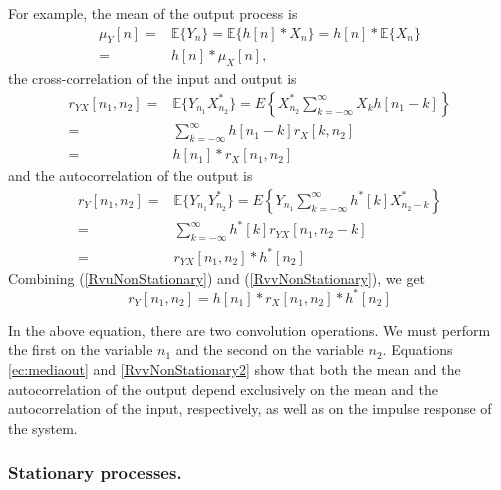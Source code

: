 For example, the mean of the output process is
\begin{align}
\mu_Y[n] 
	=& \mathbb{E}\{Y_n\} = \mathbb{E}\{h[n] \ast X_n\}
    =  h[n]*\mathbb{E}\{X_n\}                                    \nonumber\\
    =& h[n]*\mu_X[n],
\label{ec:mediaout}
\end{align}
the cross-correlation of the input and output is
\begin{align}
r_{YX}[n_1,n_2] 
	=& \mathbb{E}\{Y_{n_1} X_{n_2}^*\}
  	= E\left\{X_{n_2}^* \sum_{k=-\infty}^{\infty} X_k h[n_1-k] \right\} \nonumber \\
    =& \sum_{k=-\infty}^{\infty} h[n_1-k] r_X[k, n_2] \nonumber \\
    =& h[n_1] \ast r_X[n_1, n_2]
\label{RvuNonStationary}
\end{align}
and the autocorrelation of the output is
\begin{align}
r_{Y}[n_1, n_2] 
   =& \mathbb{E}\{Y_{n_1} Y_{n_2}^* \}
   =  E\left\{Y_{n_1} \sum_{k=-\infty}^{\infty} h^*[k] X_{n_2-k}^* \right\} \nonumber\\
   =& \sum_{k=-\infty}^{\infty} h^*[k] r_{YX}[n_1, n_2 - k]                 \nonumber\\
   =& r_{YX}[n_1, n_2] \ast h^*[n_2]
  \label{RvvNonStationary}
\end{align}
Combining (\ref{RvuNonStationary}) and (\ref{RvvNonStationary}), we get
\begin{equation}
r_Y[n_1,n_2] = h[n_1]*r_X[n_1, n_2]*h^*[n_2]
\label{RvvNonStationary2}
\end{equation}

In the above equation, there are two convolution operations. We must perform the first on the variable $n_1$ and the second on the variable $n_2$. Equations \eqref{ec:mediaout} and \eqref{RvvNonStationary2} show that both the mean and the autocorrelation of the output depend exclusively on the mean and the autocorrelation of the input, respectively, as well as on the impulse response of the system.



\subsubsection{Stationary processes.}

